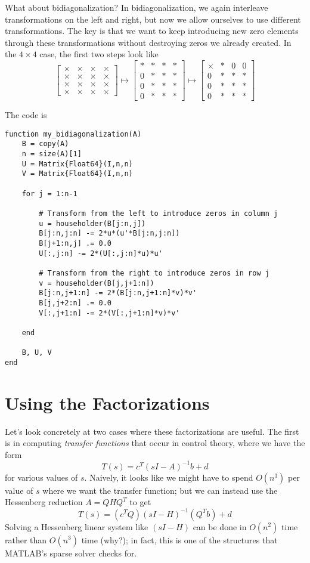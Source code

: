 \documentclass[12pt, leqno]{article} %
\begin{document}
What about bidiagonalization?  In bidiagonalization, we again
interleave transformations on the left and right, but now we allow
ourselves to use different transformations.  The key is that we
want to keep introducing new zero elements through these
transformations without destroying zeros we already created.
In the $4 \times 4$ case, the first two steps look like
\[
\begin{bmatrix}
  \times & \times & \times & \times \\
  \times & \times & \times & \times \\
  \times & \times & \times & \times \\
  \times & \times & \times & \times
\end{bmatrix} \mapsto
\begin{bmatrix}
  * & * & * & * \\
  0 & * & * & * \\
  0 & * & * & * \\
  0 & * & * & *
\end{bmatrix} \mapsto
\begin{bmatrix}
  \times & * & 0 & 0 \\
  0 & * & * & * \\
  0 & * & * & * \\
  0 & * & * & *
\end{bmatrix}
\]

The code is
\begin{lstlisting}
function my_bidiagonalization(A)
	B = copy(A)
	n = size(A)[1]
	U = Matrix{Float64}(I,n,n)
	V = Matrix{Float64}(I,n,n)

	for j = 1:n-1

		# Transform from the left to introduce zeros in column j
		u = householder(B[j:n,j])
		B[j:n,j:n] -= 2*u*(u'*B[j:n,j:n])
		B[j+1:n,j] .= 0.0
		U[:,j:n] -= 2*(U[:,j:n]*u)*u'

		# Transform from the right to introduce zeros in row j
		v = householder(B[j,j+1:n])
		B[j:n,j+1:n] -= 2*(B[j:n,j+1:n]*v)*v'
		B[j,j+2:n] .= 0.0
		V[:,j+1:n] -= 2*(V[:,j+1:n]*v)*v'

	end

	B, U, V
end
\end{lstlisting}

\section{Using the Factorizations}

Let's look concretely at two cases where these factorizations are
useful.  The first is in computing {\em transfer functions}
that occur in control theory, where we have the form
\[
  T(s) = c^T (sI-A)^{-1} b + d
\]
for various values of $s$.  Naively, it looks like we might have
to spend $O(n^3)$ per value of $s$ where we want the transfer
function; but we can instead use the Hessenberg reduction
$A = Q H Q^T$ to get
\[
  T(s) = (c^T Q) (sI-H)^{-1} (Q^T b) + d
\]
Solving a Hessenberg linear system like $(sI-H)$ can be done in
$O(n^2)$ time rather than $O(n^3)$ time (why?); in fact, this is one
of the structures that MATLAB's sparse solver checks for.
\end{document}
